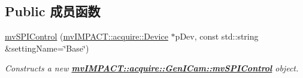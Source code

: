 \subsection*{Public 成员函数}
\begin{DoxyCompactItemize}
\item 
\hyperlink{classmv_i_m_p_a_c_t_1_1acquire_1_1_gen_i_cam_1_1mv_s_p_i_control_a037d88b9ba208e0f88844e255ae4e5df}{mv\+S\+P\+I\+Control} (\hyperlink{classmv_i_m_p_a_c_t_1_1acquire_1_1_device}{mv\+I\+M\+P\+A\+C\+T\+::acquire\+::\+Device} $\ast$p\+Dev, const std\+::string \&setting\+Name=\char`\"{}Base\char`\"{})
\begin{DoxyCompactList}\small\item\em Constructs a new {\bfseries \hyperlink{classmv_i_m_p_a_c_t_1_1acquire_1_1_gen_i_cam_1_1mv_s_p_i_control}{mv\+I\+M\+P\+A\+C\+T\+::acquire\+::\+Gen\+I\+Cam\+::mv\+S\+P\+I\+Control}} object. \end{DoxyCompactList}\end{DoxyCompactItemize}
